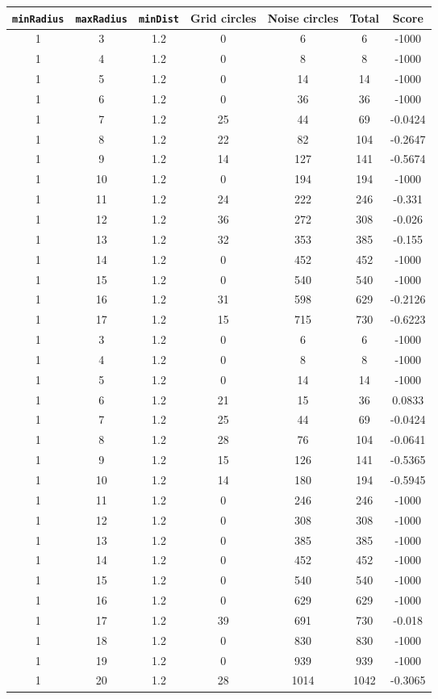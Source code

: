 \documentclass[letterpaper, 12pt]{article}
\begin{document}
\begin{longtable}{|c|c|c|c|c|c|c|}
\hline
\textbf{\texttt{minRadius}} & \textbf{\texttt{maxRadius}} & \textbf{\texttt{minDist}} & \textbf{Grid circles} & \textbf{Noise circles} & \textbf{Total} & \textbf{Score} \\
\hline
1 & 3 & 1.2 & 0 & 6 & 6 & -1000 \\
\hline
1 & 4 & 1.2 & 0 & 8 & 8 & -1000 \\
\hline
1 & 5 & 1.2 & 0 & 14 & 14 & -1000 \\
\hline
1 & 6 & 1.2 & 0 & 36 & 36 & -1000 \\
\hline
1 & 7 & 1.2 & 25 & 44 & 69 & -0.0424 \\
\hline
1 & 8 & 1.2 & 22 & 82 & 104 & -0.2647 \\
\hline
1 & 9 & 1.2 & 14 & 127 & 141 & -0.5674 \\
\hline
1 & 10 & 1.2 & 0 & 194 & 194 & -1000 \\
\hline
1 & 11 & 1.2 & 24 & 222 & 246 & -0.331 \\
\hline
1 & 12 & 1.2 & 36 & 272 & 308 & -0.026 \\
\hline
1 & 13 & 1.2 & 32 & 353 & 385 & -0.155 \\
\hline
1 & 14 & 1.2 & 0 & 452 & 452 & -1000 \\
\hline
1 & 15 & 1.2 & 0 & 540 & 540 & -1000 \\
\hline
1 & 16 & 1.2 & 31 & 598 & 629 & -0.2126 \\
\hline
1 & 17 & 1.2 & 15 & 715 & 730 & -0.6223 \\
\hline
1 & 3 & 1.2 & 0 & 6 & 6 & -1000 \\
\hline
1 & 4 & 1.2 & 0 & 8 & 8 & -1000 \\
\hline
1 & 5 & 1.2 & 0 & 14 & 14 & -1000 \\
\hline
1 & 6 & 1.2 & 21 & 15 & 36 & 0.0833 \\
\hline
1 & 7 & 1.2 & 25 & 44 & 69 & -0.0424 \\
\hline
1 & 8 & 1.2 & 28 & 76 & 104 & -0.0641 \\
\hline
1 & 9 & 1.2 & 15 & 126 & 141 & -0.5365 \\
\hline
1 & 10 & 1.2 & 14 & 180 & 194 & -0.5945 \\
\hline
1 & 11 & 1.2 & 0 & 246 & 246 & -1000 \\
\hline
1 & 12 & 1.2 & 0 & 308 & 308 & -1000 \\
\hline
1 & 13 & 1.2 & 0 & 385 & 385 & -1000 \\
\hline
1 & 14 & 1.2 & 0 & 452 & 452 & -1000 \\
\hline
1 & 15 & 1.2 & 0 & 540 & 540 & -1000 \\
\hline
1 & 16 & 1.2 & 0 & 629 & 629 & -1000 \\
\hline
1 & 17 & 1.2 & 39 & 691 & 730 & -0.018 \\
\hline
1 & 18 & 1.2 & 0 & 830 & 830 & -1000 \\
\hline
1 & 19 & 1.2 & 0 & 939 & 939 & -1000 \\
\hline
1 & 20 & 1.2 & 28 & 1014 & 1042 & -0.3065 \\
\hline
\end{longtable}
\end{document}
